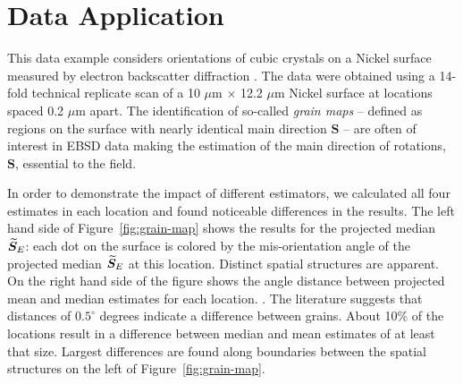 \section{Data Application}\label{sec:data}

This data example considers orientations of cubic crystals on a Nickel surface measured by electron backscatter diffraction \citep{bingham10b}. The data were obtained using a 14-fold technical replicate scan of a 10 $\mu$m $\times$ 12.2 $\mu$m Nickel surface at locations spaced 0.2 $\mu$m apart.
The identification of so-called {\it grain maps} -- defined as regions on the surface with nearly identical main direction $\bm S$ -- are often of interest in EBSD data making the estimation of the main direction of rotations, $\bm S$, essential to the field. 

In order to demonstrate the impact of different estimators, we calculated all four estimates in each location and found noticeable differences in the results. 
The left hand side of Figure~\ref{fig:grain-map} shows the results for the projected median   ${\widetilde{\bm S}_E}$: each dot on the surface is colored by  the mis-orientation angle of the  projected median ${\widetilde{\bm S}_E}$ at this  location.  Distinct spatial structures   are apparent. On the right hand side of the figure shows the angle distance between projected mean and median estimates for each location. . The literature \citep{bingham10b} suggests that distances of $0.5^\circ$ degrees indicate a difference between grains. About 10\% of the locations result in a difference between median and mean estimates of at least that size. Largest differences are found along  boundaries between the spatial structures on the left of Figure~\ref{fig:grain-map}.  


